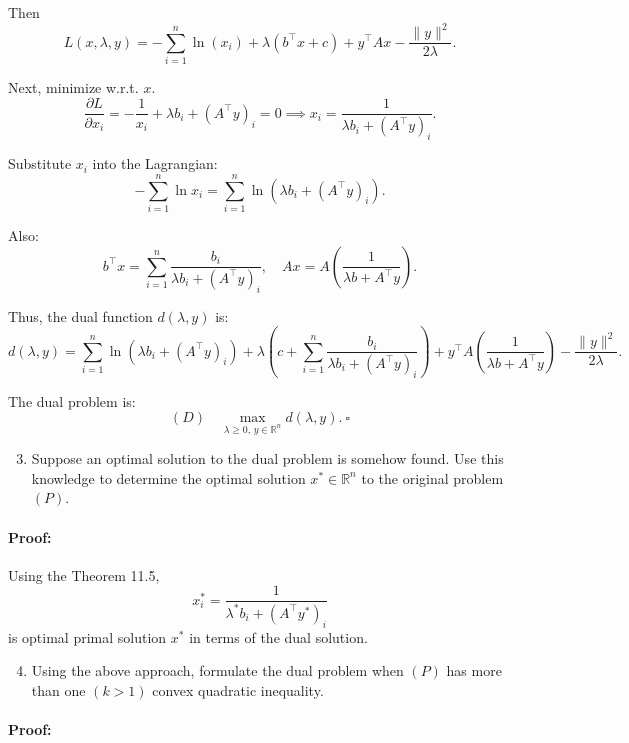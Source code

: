 \documentclass[10pt]{article}
\begin{document}
Then
\[
L(x,\lambda,y) = -\sum_{i=1}^n \ln(x_i) + \lambda(b^\top x + c) + y^\top A x - \frac{\|y\|^2}{2\lambda}.
\]

Next, minimize w.r.t. $x$. 
\[
\frac{\partial L}{\partial x_i} = -\frac{1}{x_i} + \lambda b_i + (A^\top y)_i = 0 \implies x_i = \frac{1}{\lambda b_i + (A^\top y)_i}.
\]

Substitute $x_i$ into the Lagrangian:
\[
-\sum_{i=1}^n \ln x_i = \sum_{i=1}^n \ln(\lambda b_i + (A^\top y)_i).
\]

Also:
\[
b^\top x = \sum_{i=1}^n \frac{b_i}{\lambda b_i+(A^\top y)_i}, \quad A x = A\left(\frac{1}{\lambda b + A^\top y}\right).
\]

Thus, the dual function $d(\lambda,y)$ is:
\[
d(\lambda,y) = \sum_{i=1}^n \ln(\lambda b_i + (A^\top y)_i) + \lambda\left(c + \sum_{i=1}^n \frac{b_i}{\lambda b_i+(A^\top y)_i}\right) + y^\top A\left(\frac{1}{\lambda b + A^\top y}\right) - \frac{\|y\|^2}{2\lambda}.
\]

The dual problem is:
\[
(D) \quad \max_{\lambda\ge 0,\,y\in\mathbb{R}^n} d(\lambda,y). \ \square
\]



\begin{enumerate}[label=(\alph*)]
  \setcounter{enumi}{2}
  \item Suppose an optimal solution to the dual problem is somehow found. Use this knowledge to determine the optimal solution
        $x^* \in \mathbb{R}^n$ to the original problem $(P)$.
\end{enumerate}

\paragraph{Proof:}

Using the Theorem 11.5, 
\[
x_i^* = \frac{1}{\lambda^* b_i + (A^\top y^*)_i}
\]
is optimal primal solution $x^*$ in terms of the dual solution.



\begin{enumerate}[label=(\alph*)]
  \setcounter{enumi}{3}
  \item Using the above approach, formulate the dual problem when $(P)$ has more 
  than one $(k>1)$ convex quadratic inequality.
\end{enumerate}

\paragraph{Proof:}
\end{document}
